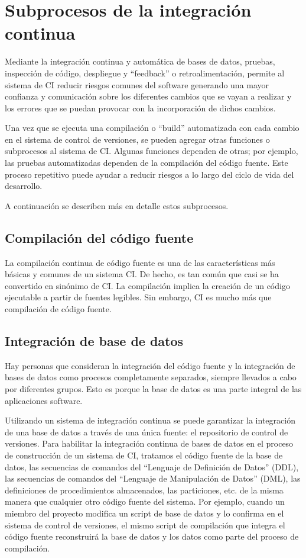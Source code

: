 \section{Subprocesos de la integración continua}
Mediante la integración continua y automática de bases de datos, pruebas, inspección de código, despliegue y ``feedback'' o retroalimentación, permite al sistema de CI reducir riesgos comunes del software generando una mayor confianza y comunicación sobre los diferentes cambios que se vayan a realizar y los errores que se puedan provocar con la incorporación de dichos cambios. 

Una vez que se ejecuta una compilación o ``build'' automatizada con cada cambio en el sistema de control de versiones, se pueden agregar otras funciones o subprocesos al sistema de CI. Algunas funciones dependen de otras; por ejemplo, las pruebas automatizadas  dependen de la compilación del código fuente. Este proceso repetitivo puede ayudar a reducir riesgos a lo largo del ciclo de vida del desarrollo.

A continuación se describen más en detalle estos subprocesos.

\subsection{Compilación del código fuente}
La compilación continua de código fuente es una de las características más básicas y comunes de un sistema CI. De hecho, es tan común que casi se ha convertido en sinónimo de CI. La compilación implica la creación de un código ejecutable a partir de fuentes legibles. Sin embargo, CI es mucho más que compilación de código fuente.

\subsection{Integración de base de datos}
Hay personas que consideran la integración del código fuente y la integración de bases de datos como procesos completamente separados, siempre llevados a cabo por diferentes grupos. Esto es porque la base de datos es una parte integral de las aplicaciones software. 

Utilizando un sistema de integración continua se puede garantizar la integración de una base de datos a través de una única fuente: el repositorio de control de versiones. Para habilitar la integración continua de bases de datos en el proceso de construcción de un sistema de CI, tratamos el código fuente de la base de datos, las secuencias de comandos del ``Lenguaje de Definición de Datos'' (DDL), las secuencias de comandos del ``Lenguaje de Manipulación de Datos'' (DML), las definiciones de procedimientos almacenados, las particiones, etc. de la misma manera que cualquier otro código fuente del sistema. Por ejemplo, cuando un miembro del proyecto modifica un script de base de datos y lo confirma en el sistema de control de versiones, el mismo script de compilación que integra el código fuente reconstruirá la base de datos y los datos como parte del proceso de compilación.

